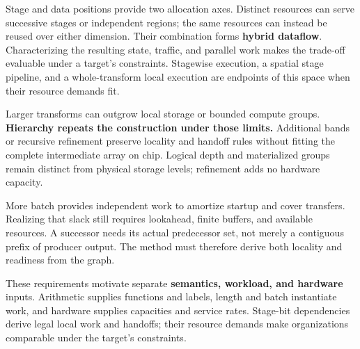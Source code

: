 Stage and data positions provide two allocation axes. Distinct resources can
serve successive stages or independent regions; the same resources can
instead be reused over either dimension. Their combination forms
\textbf{hybrid dataflow}. Characterizing the resulting state, traffic, and
parallel work makes the trade-off evaluable under a target's constraints.
Stagewise execution, a spatial stage pipeline, and a whole-transform local
execution are endpoints of this space when their resource demands fit.

Larger transforms can outgrow local storage or bounded compute groups.
\textbf{Hierarchy repeats the construction under those limits.}
Additional bands or recursive refinement preserve locality and handoff rules
without fitting the complete intermediate array on chip. Logical depth and
materialized groups remain distinct from physical storage levels; refinement
adds no hardware capacity.

More batch provides independent work to amortize startup and cover transfers.
Realizing that slack still requires lookahead, finite buffers, and available
resources. A successor needs its actual predecessor set, not merely a
contiguous prefix of producer output. The method must therefore derive both
locality and readiness from the graph.

These requirements motivate separate \textbf{semantics, workload, and hardware}
inputs. Arithmetic supplies functions and labels, length and batch instantiate
work, and hardware supplies capacities and service rates. Stage-bit dependencies
derive legal local work and handoffs; their resource demands make organizations
comparable under the target's constraints.
